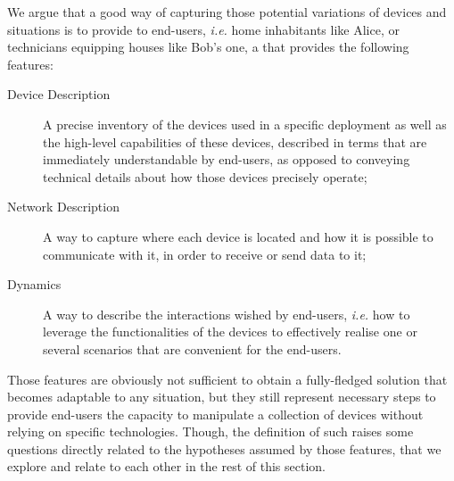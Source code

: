 We argue that a good way of capturing those potential variations of devices and situations is to provide to end-users, \textit{i.e.} home inhabitants like Alice, or technicians equipping houses like Bob's one, a \DSL that provides the following features:

\begin{description}
	\item[Device Description] A precise inventory of the devices used in a specific deployment as well as the high-level capabilities of these devices, described in terms that are immediately understandable by end-users, as opposed to conveying technical details about how those devices precisely operate;
	
	\item[Network Description] A way to capture where each device is located and how it is possible to communicate with it, in order to receive or send data to it;

	\item[Dynamics] A way to describe the interactions wished by end-users, \textit{i.e.} how to leverage the functionalities of the devices to effectively realise one or several scenarios that are convenient for the end-users.  
	
\end{description}
Those features are obviously not sufficient to obtain a fully-fledged solution that becomes adaptable to any situation, but they still represent necessary steps to provide end-users the capacity to manipulate a collection of devices without relying on specific technologies. Though, the definition of such \DSLS raises some questions directly related to the hypotheses assumed by those features, that we explore and relate to each other in the rest of this section.


